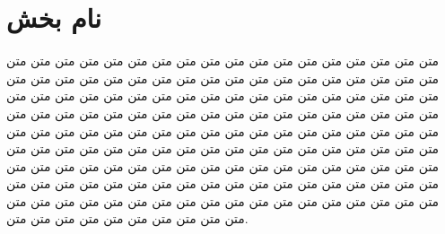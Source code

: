 \section{نام بخش}
متن متن متن متن متن متن متن متن متن متن متن متن متن متن متن متن متن متن متن متن متن متن متن متن متن متن متن متن متن متن متن متن متن متن متن متن متن متن متن متن متن متن متن متن متن متن متن متن متن متن متن متن متن متن متن متن متن متن متن متن متن متن متن متن متن متن متن متن متن متن متن متن متن متن متن متن متن متن متن متن متن متن متن متن متن متن متن متن متن متن متن متن متن متن متن متن متن متن متن متن متن متن متن متن متن متن متن متن متن متن متن متن متن متن متن متن متن متن متن متن متن متن متن متن متن متن متن متن متن متن متن متن متن متن متن متن متن متن متن متن متن متن متن متن متن متن متن متن متن متن متن متن متن متن متن متن متن متن متن متن متن متن متن متن متن متن متن متن متن متن متن متن.

